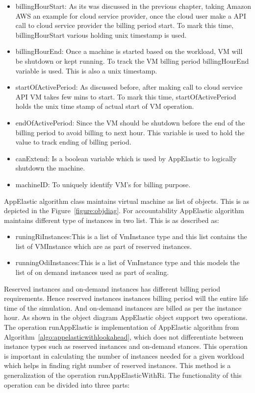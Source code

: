 \begin{itemize}
  \item billingHourStart: As its was discussed in the previous chapter, taking Amazon AWS an example for cloud service provider, once the cloud user make a API call to cloud service provider the billing period start. To mark this time, billingHourStart various holding unix timestamp is used.
  \item billingHourEnd: Once a machine is started based on the workload, VM will be shutdown or kept running. To track the VM billing period billingHourEnd variable is used. This is also a unix timestamp.
  \item startOfActivePeriod: As discussed before, after making call to cloud service API VM takes few mins to start. To mark this time,  startOfActivePeriod holds the unix time stamp of actual start of VM operation.
  \item endOfActivePeriod: Since the VM should be shutdown before the end of the billing period to avoid billing to next hour. This variable is used to hold the value to track ending of billing period.
  \item canExtend: Is a boolean variable which is used by AppElastic to logically shutdown the machine.
  \item machineID: To uniquely identify VM's for billing purpose.
\end{itemize}
AppElastic algorithm class maintains virtual machine as list of objects. This is as depicted in the Figure~\ref{figure:objdiag}. For accountability AppElastic algorithm maintains different type of instances in two list. This is as described as:
\begin{itemize}
  \item runingRiInstances:This is a list of VmInstance type and this list contains the list of VMInstance which are as part of reserved instances.
  \item runningOdiInstances:This is a list of VmInstance type and this models the list of on demand instances used as part of scaling.
\end{itemize}
Reserved instances and on-demand instances has different billing period requirements. Hence reserved instances instances billing period will the entire life time of the simulation. And on-demand instances are billed as per the instance hour. As shown in the object diagram AppElastic object support two operations. The operation runAppElastic is implementation of AppElastic algorithm from Algorithm~\ref{algo:appelasticwithlookahead}, which does not differentiate between instance types such as reserved instances and on-demand stances. This operation is important in calculating the number of instances needed for a given workload which helps in finding right number of reserved instances.  This method is a generalization of the operation runAppElasticWithRi. The functionality of this operation can be divided into three parts:

